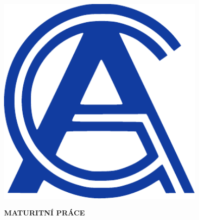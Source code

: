 

\pagestyle{empty}
\hypersetup{pageanchor=false}

\begin{center}

{\LARGE\bfseries\NazevSkoly}

\vspace{-22mm}
\vfill

{\LARGE\NazevOboru}

\vfill

\centerline{\mbox{\includegraphics[width=100mm]{../img/logo-ga-new.pdf}}}

\vspace{-8mm}
\vfill

{\bf\Large MATURITNÍ PRÁCE}

\vfill

{\Large \AutorPrace}

\vspace{15mm}

{\LARGE\bfseries\NazevPrace}




\vfill

\MesicOdevzdani \ \RokOdevzdani

\end{center}

